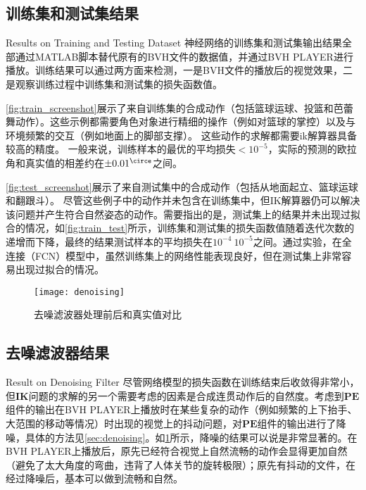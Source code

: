 \subsection{训练集和测试集结果}{Results on Training and Testing Dataset}
神经网络的训练集和测试集输出结果全部通过MATLAB脚本替代原有的BVH文件的数据值，并通过BVH PLAYER进行播放。训练结果可以通过两方面来检测，一是BVH文件的播放后的视觉效果，二是观察训练过程中训练集和测试集的损失函数值。

\cref{fig:train_screenshot}展示了来自训练集的合成动作（包括篮球运球、投篮和芭蕾舞动作）。这些示例都需要角色对象进行精细的操作（例如对篮球的掌控）以及与环境频繁的交互（例如地面上的脚部支撑）。 这些动作的求解都需要ik解算器具备较高的精度。 一般来说，训练样本的最优的平均损失$<10^{-5}$，实际的预测的欧拉角和真实值的相差约在$\pm0.01^\circe$之间。

\cref{fig:test_screenshot}展示了来自测试集中的合成动作（包括从地面起立、篮球运球和翻跟斗）。
尽管这些例子中的动作并未包含在训练集中，但IK解算器仍可以解决该问题并产生符合自然姿态的动作。需要指出的是，测试集上的结果并未出现过拟合的情况，如\cref{fig:train_test}所示，训练集和测试集的损失函数值随着迭代次数的递增而下降，最终的结果测试样本的平均损失在$10^{-4}~10^{-5}$之间。通过实验，在全连接（FCN）模型中，虽然训练集上的网络性能表现良好，但在测试集上非常容易出现过拟合的情况。

\begin{figure}[!htbp]
	\centering
	\texttt{[image: denoising]}
	\caption[]{\label{fig:denoising}
		去噪滤波器处理前后和真实值对比
	}
\end{figure}
\subsection{去噪滤波器结果}{Result on Denoising Filter}
尽管网络模型的损失函数在训练结束后收敛得非常小，但\textbf{IK}问题的求解的另一个需要考虑的因素是合成连贯动作后的自然度。考虑到$\mathbf{PE}$组件的输出在BVH PLAYER上播放时在某些复杂的动作（例如频繁的上下抬手、大范围的移动等情况）时出现的视觉上的抖动问题，对$\mathbf{PE}$组件的输出进行了降噪，具体的方法见\ref{sec:denoising}。如\cref{fig:denoising}所示，降噪的结果可以说是非常显著的。在BVH PLAYER上播放后，原先已经符合视觉上自然流畅的动作会显得更加自然（避免了太大角度的弯曲，违背了人体关节的旋转极限）；原先有抖动的文件，在经过降噪后，基本可以做到流畅和自然。
\label{res:denoising}

